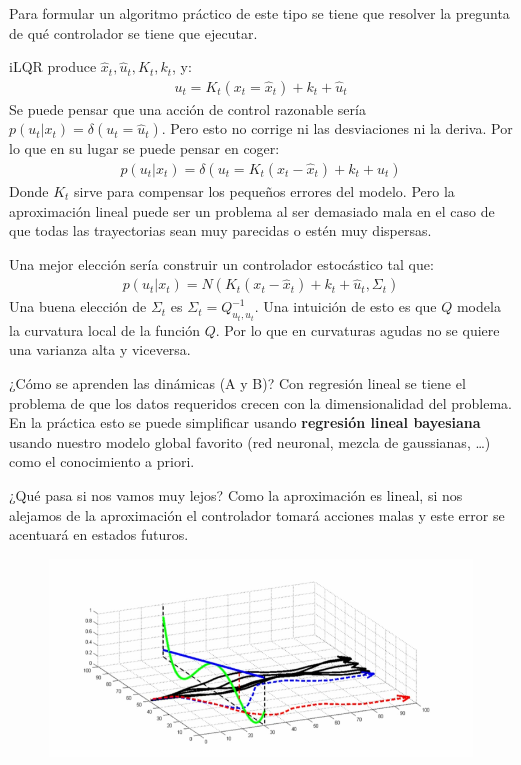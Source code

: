 Para formular un algoritmo práctico de este tipo se tiene que resolver la pregunta de qué
controlador se tiene que ejecutar.

iLQR produce $\hat{x}_t,\hat{u}_t, K_t,k_t$, y:
\begin{align}
    u_t=K_t(x_t= \hat{x}_t)+k_t+\hat{u}_t
\end{align}
Se puede pensar que una acción de control razonable sería
$p(u_t|x_t)=\delta(u_t=\hat{u}_t)$. Pero esto no corrige ni las desviaciones ni la deriva. Por lo
que en su lugar se puede pensar en coger:
\begin{align}
p ( u _ { t } | x _ { t } ) = \delta ( u _ { t } = K _ { t } ( x _ { t } - \hat { x } _ { t } ) + k _ { t } + \hat { u } _ { t } )
\end{align}
Donde $K_t$ sirve para compensar los pequeños errores del modelo. Pero la aproximación lineal
puede ser un problema al ser demasiado mala en el caso de que todas las trayectorias sean
muy parecidas o estén muy dispersas. 

Una mejor elección sería construir un controlador estocástico tal que:
\begin{align}
p ( u _ { t } | x _ { t } ) = N ( K _ { t } ( x _ { t } - \hat { x } _ { t } ) + k _ { t } + \hat { u } _ { t } , \Sigma _ { t } )
\end{align}
Una buena elección de $\Sigma_t$ es $\Sigma_t=Q^{-1}_{u_t,u_t}$. Una intuición de esto es
que  $Q$ modela la curvatura local de la función $Q$. Por lo que en curvaturas agudas no
se quiere una varianza alta y viceversa.

¿Cómo se aprenden las dinámicas (A y B)? Con regresión lineal se tiene el problema de que los
datos requeridos crecen con la dimensionalidad del problema. En la práctica esto se puede
simplificar usando \textbf{regresión lineal bayesiana} usando nuestro modelo global favorito (red
neuronal, mezcla de gaussianas, \ldots) como el conocimiento a priori.

¿Qué pasa si nos vamos muy lejos? Como la aproximación es lineal, si nos alejamos de la
aproximación el controlador tomará acciones malas y este error se acentuará en estados futuros.
\begin{figure}[H]
	\centering
	\includegraphics[width=0.6\linewidth]{figures/2020-07-02-185253_754x352_scrot.png}
\end{figure}

